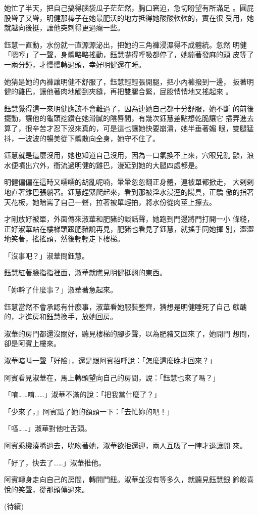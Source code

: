 她忙了半天，把自己搞得腦袋瓜子茫茫然，胸口窘迫，急切盼望有所滿足
。圓屁股聳了又聳，明健那棒子在她最肥沃的地方抵得她酸酸軟軟的，實在很
受用，她就越向後挺，讓他突刺得更過癮一些。

鈺慧一直動，水份就一直源源泌出，把她的三角褲浸濕得不成體統。忽然
明健「嗯哼」了一聲，身體略略搖動，鈺慧嚇得呼吸都停了，她繃著發麻的頭
皮等了一兩分鐘，才慢慢轉過頭，幸好明健還在睡。

她猜是她的內褲讓明健不舒服了，鈺慧輕輕張開腿，把小內褲撥到一邊，
扳著明健的雞巴，讓他著肉地觸到夾縫，再把雙腿合緊，屁股悄悄地又搖起來
。

鈺慧覺得這一來明健應該不會難過了，因為連她自己都十分舒服，她不斷
的前後擺動，讓他的龜頭挖鑽在她滑膩的陰唇間，有幾次鈺慧差點想乾脆讓它
插弄進去算了，很辛苦才忍下沒來真的，可是這也讓她快要崩潰，她半垂著媚
眼，雙腿猛抖，一波波的暢美從下體散向全身，她守不住了。

鈺慧就是這麼沒用，她也知道自己沒用，因為一口氣換不上來，穴眼兒亂
顫，浪水便噴出穴外，衝流過明健的雞巴，漫延到她的大腿四處都是。

明健偏偏在這時又嚅嚅的胡亂呢喃，暈暈忽忽翻正身體，連被單都掀走，
大剌剌地直著雞巴張躺著。鈺慧趕緊爬起來，看到那被淫水浸溼的陽具，正驕
傲的指著天花板，她暗罵了自己一聲，拉著被單輕拍，將水份從肉莖上擦去。

才剛放好被單，外面傳來淑華和肥豬的談話聲，她跑到門邊將門打開一小
條縫，正好淑華站在樓梯頭跟肥豬說再見，肥豬也看見了鈺慧，就搖手同她揮
別，澀澀地笑著，搖搖頭，然後輕輕走下樓梯。

「沒事吧？」淑華問鈺慧。

鈺慧紅著臉指指裡面，淑華就瞧見明健挺翹的東西。

「妳幹了什麼事？」淑華著急起來。

鈺慧當然不會承認有什麼事，淑華看她服裝整齊，猜想是明健睡死了自己
獻醜的，才進房和鈺慧換手，放她回房。

淑華的房門都還沒關好，聽見樓梯的腳步聲，以為肥豬又回來了，她開門
想問，卻是阿賓上樓來。

淑華暗叫一聲「好險」，還是跟阿賓招呼說：「怎麼這麼晚才回來？」

阿賓看見淑華在，馬上轉頭望向自己的房間，說：「鈺慧也來了嗎？」

「唷……唷……」淑華不滿的說：「把我當什麼了？」

「少來了，」阿賓點了她的額頭一下：「去忙妳的吧！」

「嘔……」淑華對他吐舌頭。

阿賓乘機湊嘴過去，吮吻著她，淑華欲拒還迎，兩人互吸了一陣才退讓開
來。

「好了，快去了……」淑華推他。

阿賓轉身走向自己的房間，轉開門鈕。淑華並沒有等多久，就聽見鈺慧銀
鈴般喜悅的笑聲，從那頭傳過來。

(待續)










